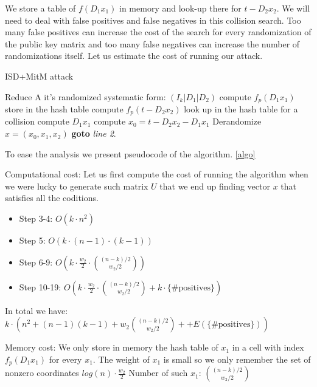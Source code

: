 \documentclass[12pt]{article}
\begin{document}
We store a table of $f(D_1x_1)$ in memory and look-up there for $t - D_2x_2$. We will need to deal with false positives and false negatives in this collision search. Too many false positives can increase the cost of the search for every randomization of the public key matrix and too many false negatives can increase the number of randomizations itself. Let us estimate the cost of running our attack.
\begin{algorithm}
\caption{ISD+MitM attack}\label{algo}
\begin{algorithmic}[1]
    \State Reduce A it's randomized systematic form: $(I_k |D_1|D_2)$
    \State compute $f_{p}(D_1x_1)$
    \State store in the hash table
    \EndFor
    \State compute $f_{p}(t - D_2x_2)$
    \State look up in the hash table for a collision
        \State compute $D_1x_1$
        \State compute $x_0 = t - D_2x_2 - D_1x_1$
        \State \Return Derandomize $x = (x_0, x_1, x_2)$
        \EndIf
    \EndIf
    \EndFor
\State \textbf{goto} \emph{line 2}.
\EndProcedure
\end{algorithmic}
\end{algorithm}
To ease the analysis we present pseudocode of the algorithm. \ref{algo}

Computational cost:
Let us first compute the cost of running the algorithm when we were lucky to generate such matrix $U$ that we end up finding vector $x$ that satisfies all the coditions.
\begin{itemize}
    \item Step 3-4: $O(k \cdot n^2)$
    \item Step 5: $O(k \cdot (n-1) \cdot (k-1))$
    \item Step 6-9: $O(k \cdot \frac{w_2}{2} \cdot \binom{(n-k)/2}{w_2/2})$
    \item Step 10-19: $O(k \cdot \frac{w_2}{2} \cdot \binom{(n-k)/2}{w_2/2} + k \cdot \{\text{\# positives}\})$
\end{itemize}
In total we have: $k \cdot (n^2 + (n-1)(k-1) + w_2\binom{(n-k)/2}{w_2/2} + + E(\{\text{\# positives}\}))$

Memory cost:
We only store in memory the hash table of $x_1$ in a cell with index $f_{p}(D_1x_1)$ for every $x_1$.
The weight of $x_1$ is small so we only remember the set of nonzero coordinates $log(n) \cdot \frac{w_2}{2}$ Number of such $x_1$: $\binom{(n-k)/2}{w_2/2}$
\end{document}
